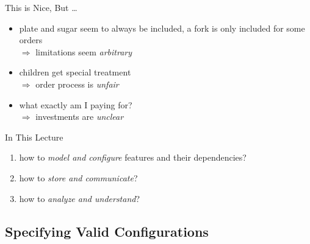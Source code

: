 \begin{frame}{\myframetitle}
	\begin{fancycolumns}[columns=3,widths={40,20,40}]
		\nextcolumn
		\nextcolumn
		\begin{note}{This is Nice, But \ldots}
			\begin{itemize}
				\item plate and sugar seem to always be included, a fork is only included for some orders\\
					$\Rightarrow$ limitations seem \emph{arbitrary}
				\item children get special treatment\\
					$\Rightarrow$ order process is \emph{unfair}
				\item what exactly am I paying for?\\
					$\Rightarrow$ investments are \emph{unclear}
			\end{itemize}
		\end{note}
		\begin{definition}{In This Lecture}
			\begin{enumerate}
				\item how to \emph{model and configure} features and their dependencies?
				\item how to \emph{store and communicate}?
				\item how to \emph{analyze and understand}?
			\end{enumerate}
		\end{definition}
	\end{fancycolumns}
\end{frame}

\subsection{Specifying Valid Configurations}

\newcommand{\feat}[1]{{\emph{#1}}}
\newcommand{\exampleFeatureSetConfigDB}{
	\vspace*{-3ex}
	\begin{align*}
		\text{Feature set } F = \{&\textbf{C}onfigDB, \textbf{G}et, \textbf{P}ut, \textbf{D}elete,\\
		&\textbf{T}ransactions, \textbf{W}indows, \textbf{L}inux\}
	\end{align*}
}

